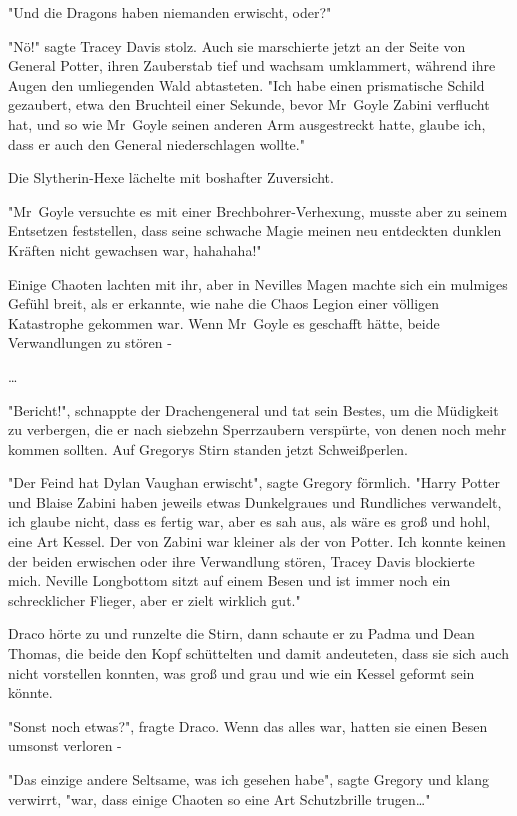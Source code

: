 {"Und die Dragons haben niemanden erwischt, oder?"

"Nö!" sagte Tracey Davis stolz. Auch sie marschierte jetzt an der Seite von General Potter, ihren Zauberstab tief und wachsam umklammert, während ihre Augen den umliegenden Wald abtasteten. "Ich habe einen prismatische Schild gezaubert, etwa den Bruchteil einer Sekunde, bevor Mr~Goyle Zabini verflucht hat, und so wie Mr~Goyle seinen anderen Arm ausgestreckt hatte, glaube ich, dass er auch den General niederschlagen wollte."

Die Slytherin-Hexe lächelte mit boshafter Zuversicht.

"Mr~Goyle versuchte es mit einer Brechbohrer-Verhexung, musste aber zu seinem Entsetzen feststellen, dass seine schwache Magie meinen neu entdeckten dunklen Kräften nicht gewachsen war, hahahaha!"

Einige Chaoten lachten mit ihr, aber in Nevilles Magen machte sich ein mulmiges Gefühl breit, als er erkannte, wie nahe die Chaos Legion einer völligen Katastrophe gekommen war. Wenn Mr~Goyle es geschafft hätte, beide Verwandlungen zu stören -

…

"Bericht!", schnappte der Drachengeneral und tat sein Bestes, um die Müdigkeit zu verbergen, die er nach siebzehn Sperrzaubern verspürte, von denen noch mehr kommen sollten. Auf Gregorys Stirn standen jetzt Schweißperlen.

"Der Feind hat Dylan Vaughan erwischt", sagte Gregory förmlich. "Harry Potter und Blaise Zabini haben jeweils etwas Dunkelgraues und Rundliches verwandelt, ich glaube nicht, dass es fertig war, aber es sah aus, als wäre es groß und hohl, eine Art Kessel. Der von Zabini war kleiner als der von Potter. Ich konnte keinen der beiden erwischen oder ihre Verwandlung stören, Tracey Davis blockierte mich. Neville Longbottom sitzt auf einem Besen und ist immer noch ein schrecklicher Flieger, aber er zielt wirklich gut."

Draco hörte zu und runzelte die Stirn, dann schaute er zu Padma und Dean Thomas, die beide den Kopf schüttelten und damit andeuteten, dass sie sich auch nicht vorstellen konnten, was groß und grau und wie ein Kessel geformt sein könnte.

"Sonst noch etwas?", fragte Draco. Wenn das alles war, hatten sie einen Besen umsonst verloren -

"Das einzige andere Seltsame, was ich gesehen habe", sagte Gregory und klang verwirrt, "war, dass einige Chaoten so eine Art Schutzbrille trugen…"

}

